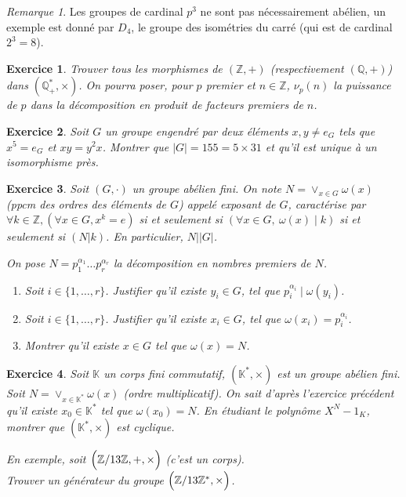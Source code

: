 \documentclass[12pt]{article}
\newtheorem{exercise}{Exercice}[section]
\theoremstyle{remark}
\theoremstyle{remark}
\newtheorem{remark}{Remarque}
\newcommand{\K}{\mathbb{K}}
\newcommand{\Q}{\mathbb{Q}}
\newcommand{\Z}{\mathbb{Z}}
\begin{document}
\begin{remark}
	Les groupes de cardinal $p^3$ ne sont pas nécessairement abélien, un exemple
	est donné par $D_{4}$, le groupe des isométries du carré (qui est de cardinal
	$2^3=8$).
\end{remark}

\begin{exercise}
	Trouver tous les morphismes de $(\Z,+)$ (respectivement $(\Q,+)$) dans
	$(\Q_{+}^*,\times)$. On pourra poser, pour $p$ premier et $n\in\Z$,
	$\nu_{p}(n)$ la puissance de $p$ dans la décomposition en produit de
	facteurs premiers de $n$.
\end{exercise}

\begin{exercise}
	Soit $G$ un groupe engendré par deux éléments $x,y\neq e_{G}$ tels que
	$x^5=e_{G}$ et $xy=y^2x$. Montrer que $\vert G\vert=155=5\times31$ et qu'il
	est unique à un isomorphisme près.
\end{exercise}

\begin{exercise}
	Soit $(G,\cdot)$ un groupe abélien fini. On note $N=\vee_{x\in G}\omega(x)$
	(ppcm des ordres des éléments de $G$) appelé exposant de $G$, caractérise
	par $\forall k\in\Z, (\forall x\in G,x^{k}=e)$ si et seulement si $(\forall
	x\in G,~\omega(x)\mid k)$ si et seulement si $(N\vert k)$. En particulier,
	$N\mid\vert G\vert$.

	On pose $N=p_{1}^{\alpha_{1}}\dots p_{r}^{\alpha_{r}}$ la décomposition en
	nombres premiers de $N$.
	\begin{enumerate}
		\item Soit $i\in\{1,\dots,r\}$. Justifier qu'il existe $y_{i}\in G$, tel
		que $p_{i}^{\alpha_{i}}\mid \omega(y_{i})$.
		\item Soit $i\in\{1,\dots,r\}$. Justifier qu'il existe $x_{i}\in G$, tel
		que $\omega(x_{i})=p_{i}^{\alpha_{i}}$.
		\item Montrer qu'il existe $x\in G$ tel que $\omega(x)=N$.
	\end{enumerate}
\end{exercise}

\begin{exercise}
	Soit $\K$ un corps fini commutatif, $(\K^*,\times)$ est un groupe abélien fini.
	Soit $N=\vee_{x\in \K^*}\omega(x)$ (ordre multiplicatif). On sait d'après
	l'exercice précédent qu'il existe $x_{0}\in\K^*$ tel que $\omega(x_{0})=N$.
	En étudiant le polynôme $X^{N}-1_{K}$, montrer que $(\K^*,\times)$ est
	cyclique.
	
	En exemple, soit $\Bigl(\Z/13\Z,+,\times\Bigr)$ (c'est un corps).\\
	Trouver un générateur du groupe $\Bigl(\Z/13\Z^*,\times\Bigr)$.
\end{exercise}
\end{document}
